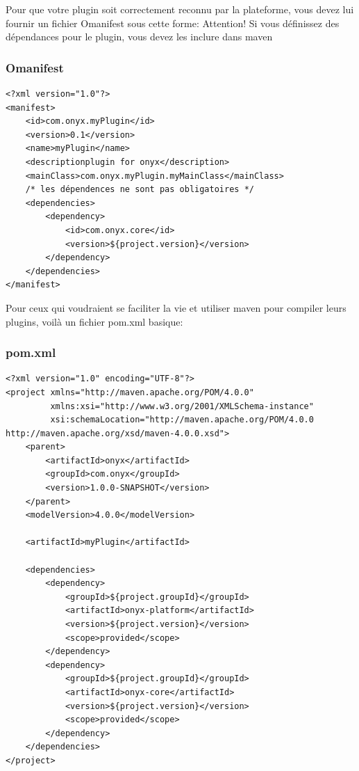 Pour que votre plugin soit correctement reconnu par la plateforme, vous devez lui fournir un fichier Omanifest sous cette forme:
Attention! Si vous définissez des dépendances pour le plugin, vous devez les inclure dans maven
\subsubsection{Omanifest}
\begin{verbatim}
<?xml version="1.0"?>
<manifest>
    <id>com.onyx.myPlugin</id>
    <version>0.1</version>
    <name>myPlugin</name>
    <descriptionplugin for onyx</description>
    <mainClass>com.onyx.myPlugin.myMainClass</mainClass>
    /* les dépendences ne sont pas obligatoires */
    <dependencies>
        <dependency>
            <id>com.onyx.core</id>
            <version>${project.version}</version>
        </dependency>
    </dependencies>
</manifest>
\end{verbatim}

Pour ceux qui voudraient se faciliter la vie et utiliser maven pour compiler leurs plugins, voilà un fichier pom.xml basique:
\subsubsection{pom.xml}
\begin{verbatim}
<?xml version="1.0" encoding="UTF-8"?>
<project xmlns="http://maven.apache.org/POM/4.0.0"
         xmlns:xsi="http://www.w3.org/2001/XMLSchema-instance"
         xsi:schemaLocation="http://maven.apache.org/POM/4.0.0 http://maven.apache.org/xsd/maven-4.0.0.xsd">
    <parent>
        <artifactId>onyx</artifactId>
        <groupId>com.onyx</groupId>
        <version>1.0.0-SNAPSHOT</version>
    </parent>
    <modelVersion>4.0.0</modelVersion>

    <artifactId>myPlugin</artifactId>

    <dependencies>
        <dependency>
            <groupId>${project.groupId}</groupId>
            <artifactId>onyx-platform</artifactId>
            <version>${project.version}</version>
            <scope>provided</scope>
        </dependency>
        <dependency>
            <groupId>${project.groupId}</groupId>
            <artifactId>onyx-core</artifactId>
            <version>${project.version}</version>
            <scope>provided</scope>
        </dependency>
    </dependencies>
</project>
\end{verbatim}
